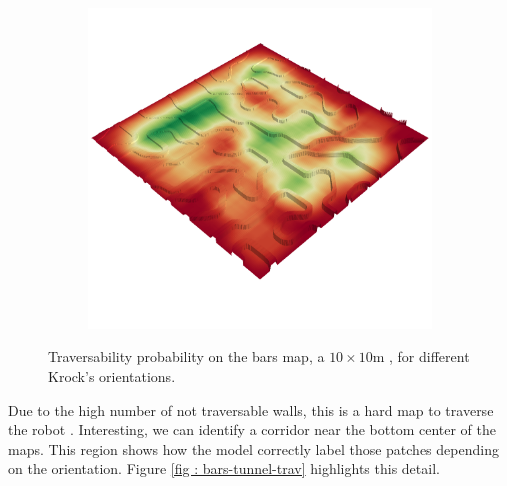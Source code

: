 \documentclass[../document.tex]{subfiles}
\begin{document}
\begin{figure} [htbp]
\begin{subfigure}[b]{0.45\textwidth}
  \end{subfigure}
  \begin{subfigure}[b]{0.45\textwidth}
      \includegraphics[width=\linewidth]{../img/4/traversability/bars/-180.png}  
  \end{subfigure}
  \caption{Traversability probability on the bars map, a $10\times 10$m , for different Krock's orientations.}
  \label{fig : bars-trav}
  \end{figure}
Due to the high number of not traversable walls, this is a hard map to traverse the robot . Interesting, we can identify a corridor near the bottom center of the maps. This region shows how the model correctly label those patches depending on the orientation. Figure \ref{fig : bars-tunnel-trav} highlights this detail.
\end{document}
